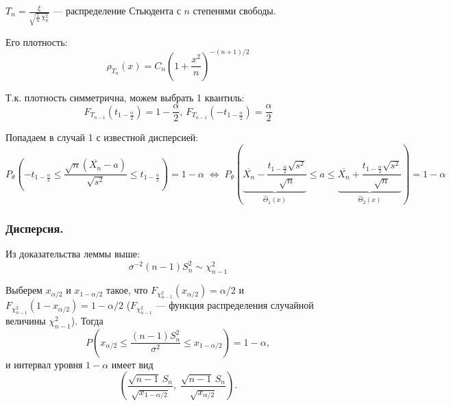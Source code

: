 \begin{enumerate}
	$T_{n} = \frac{\xi}{\sqrt{\frac1n\,\chi_n^2}}$ --- распределение Стьюдента с $n$ степенями свободы.
	
	Его плотность:
    \[ \rho_{T_n}(x) = C_n \left( 1 + \frac{x^2}{n} \right)^{-(n+1)/2} \]
 	
	Т.к. плотность симметрична, можем выбрать 1 квантиль:
	\[ F_{T_{n-1}}(t_{1 - \frac{\alpha}2}) = 1 - \frac{\alpha}2, \, F_{T_{n-1}}(-t_{1 - \frac{\alpha}2}) = \frac{\alpha}2 \]
	
	Попадаем в случай 1 с известной дисперсией:
	\[ P_{\theta} \left( -t_{1 - \frac{\alpha}2} \le \frac{\sqrt{n}(\overline{X_n} - a)}{\sqrt{s^2}} \le t_{1 - \frac{\alpha}2} \right) = 
	1 - \alpha \;\Leftrightarrow\; 
	P_{\theta} \left( \underset{\hat\Theta_1(x)}{\underbrace{\overline{X_n} - \frac{t_{1 - \frac{\alpha}2} \sqrt{s^2}}{\sqrt{n}}}} \le a \le 
	\underset{\hat\Theta_2(x)}{\underbrace{\overline{X_n} + \frac{t_{1 - \frac{\alpha}2} \sqrt{s^2}}{\sqrt{n}}}} \right) = 1 - \alpha \]
\end{enumerate}

\subsubsection{Дисперсия.}

Из доказательства леммы выше:
\[ \sigma^{-2}(n - 1) S_n^2 \sim \chi_{n-1}^2 \]

Выберем $x_{\alpha/2}$ и $x_{1-\alpha/2}$ такое, что $F_{\chi_{n-1}^2}(x_{\alpha/2}) = \alpha/2$ и $F_{\chi_{n-1}^2}(1-x_{\alpha/2}) = 1-\alpha/2$ ($F_{\chi_{n-1}^2}$ --- функция распределения случайной величины $\chi_{n-1}^2$). Тогда
\[ P \left( x_{\alpha/2} \le \frac{(n-1) S_n^2}{\sigma^2} \le x_{1-\alpha/2} \right) = 1 - \alpha, \]
и интервал уровня $1 - \alpha$ имеет вид 
\[ \left( \frac{\sqrt{n-1}\,S_n}{\sqrt{x_{1-\alpha/2}}}, \; \frac{\sqrt{n-1}\,S_n}{\sqrt{x_{\alpha/2}}} \right). \] 
